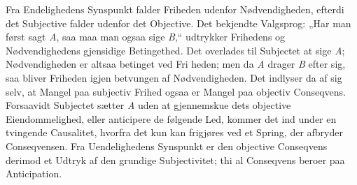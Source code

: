 \documentclass[12pt]{book}
\newcommand{\opage}[1]{\marginnote{\footnotesize\textit{[#1]}}}
\begin{document}
Fra Endelighedens Synspunkt falder Friheden udenfor Nødvendigheden, efterdi det
Subjective falder udenfor det Objective. Det bekjendte Valgsprog: „Har man først sagt
\textit{A}, saa maa man ogsaa sige \textit{B},“ udtrykker Frihedens og Nødvendighedens
gjensidige Betingethed. Det overlades til Subjectet at sige \textit{A};
Nødvendigheden er altsaa betinget ved Fri%
\opage{215}%
%
%
%
%
heden; men da \textit{A} drager \textit{B} efter sig, saa bliver Friheden igjen
betvungen af Nødvendigheden. Det indlyser da af sig selv, at Mangel paa subjectiv Frihed
ogsaa er Mangel paa objectiv Conseqvens. Forsaavidt Subjectet sætter \textit{A} uden at
gjennemskue dets objective Eiendommelighed, eller anticipere de følgende Led, kommer det
ind under en tvingende Causalitet, hvorfra det kun kan frigjøres ved et Spring, der
afbryder Conseqvensen. Fra Uendelighedens Synspunkt er den objective Conseqvens derimod
et Udtryk af den grundige Subjectivitet; thi al Conseqvens beroer paa Anticipation.
\end{document}
